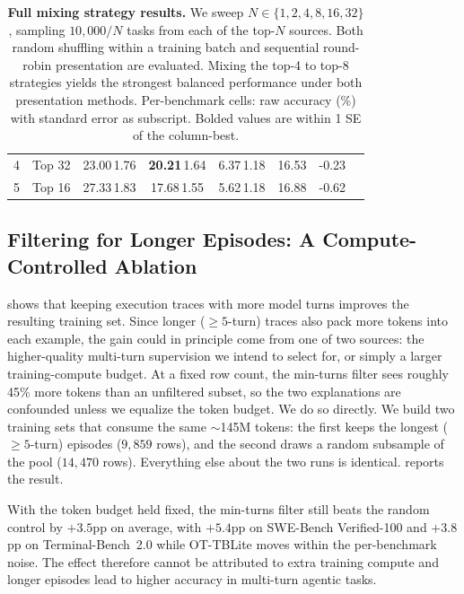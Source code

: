 \documentclass{llmxive}
\providecommand{\subscriptval}[1]{{\scriptsize #1}}
\begin{document}
\begin{table}[!htbp]
{\begin{tabular}{rlcccccc}
4 & Top 32 & 23.00\,\subscriptval{1.76} & \textbf{20.21}\,\subscriptval{1.64} & 6.37\,\subscriptval{1.18} & 16.53 & -0.23 \\
5 & Top 16 & 27.33\,\subscriptval{1.83} & 17.68\,\subscriptval{1.55} & 5.62\,\subscriptval{1.18} & 16.88 & -0.62 \\
\bottomrule
\end{tabular}}
\vspace{10pt}
\caption{\textbf{Full mixing strategy results.} We sweep $N \in \{1, 2, 4, 8, 16, 32\}$, sampling $10{,}000/N$ tasks from each of the top-$N$ sources. Both random shuffling within a training batch and sequential round-robin presentation are evaluated. Mixing the top-4 to top-8 strategies yields the strongest balanced performance under both presentation methods. Per-benchmark cells: raw accuracy (\%) with standard error as subscript. Bolded values are within 1 SE of the column-best.}
\label{tab:mixing_full}
\end{table}
\FloatBarrier

\subsection{Filtering for Longer Episodes: A Compute-Controlled Ablation}
\label{app:compute-controlled-filtering}

 shows that keeping execution traces with more model turns improves the resulting training set. Since longer ($\geq 5$-turn) traces also pack more tokens into each example, the gain could in principle come from one of two sources: the higher-quality multi-turn supervision we intend to select for, or simply a larger training-compute budget. At a fixed row count, the min-turns filter sees roughly 45\% more tokens than an unfiltered subset, so the two explanations are confounded unless we equalize the token budget. We do so directly. We build two training sets that consume the same $\sim$145M tokens: the first keeps the longest ($\geq 5$-turn) episodes ($9{,}859$ rows), and the second draws a random subsample of the pool ($14{,}470$ rows). Everything else about the two runs is identical.  reports the result.

With the token budget held fixed, the min-turns filter still beats the random control by $+3.5$pp on average, with $+5.4$pp on SWE-Bench Verified-100 and $+3.8$pp on Terminal-Bench~2.0 while OT-TBLite moves within the per-benchmark noise. The effect therefore cannot be attributed to extra training compute and longer episodes lead to higher accuracy in multi-turn agentic tasks.
\end{document}
